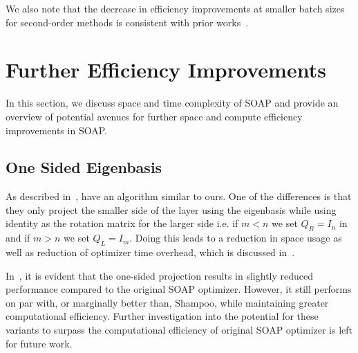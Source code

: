 \documentclass{article} %
\begin{document}
We also note that the decrease in efficiency improvements at smaller batch sizes for second-order methods is consistent with prior works~\citep{nqm,ishikawa2024when}.

\section{Further Efficiency Improvements}
\label{sec:efficiency}

In this section, we discuss space and time complexity of SOAP and provide an overview of potential avenues for further space and compute efficiency improvements in SOAP.

\subsection{One Sided Eigenbasis}
\label{sec:one-sided}

As described in~, \citet{galore} have an algorithm similar to ours. One of the differences is that they only project the smaller side of the layer using the eigenbasis while using identity as the rotation matrix for the larger side i.e. if $m < n$ we set $Q_R = I_n$ in~ and if $m > n$ we set $Q_L = I_m$. Doing this leads to a reduction in space usage as well as reduction of optimizer time overhead, which is discussed in~.

In~, it is evident that the one-sided projection results in slightly reduced performance compared to the original SOAP optimizer. However, it still performs on par with, or marginally better than, Shampoo, while maintaining greater computational efficiency. Further investigation into the potential for these variants to surpass the computational efficiency of original SOAP optimizer is left for future work.
\end{document}
